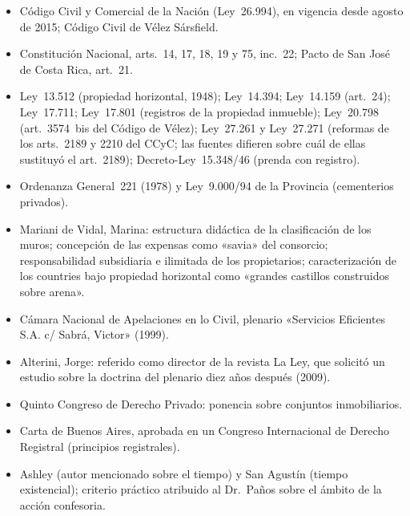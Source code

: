 \documentclass[12pt,oneside]{book}
\begin{document}
\begin{itemize}
    \item Código Civil y Comercial de la Nación (Ley~26.994), en vigencia desde agosto de 2015; Código Civil de Vélez Sársfield.
    \item Constitución Nacional, arts.~14, 17, 18, 19 y 75, inc.~22; Pacto de San José de Costa Rica, art.~21.
    \item Ley~13.512 (propiedad horizontal, 1948); Ley~14.394; Ley~14.159 (art.~24); Ley~17.711; Ley~17.801 (registros de la propiedad inmueble); Ley~20.798 (art.~3574~bis del Código de Vélez); Ley~27.261 y Ley~27.271 (reformas de los arts.~2189 y 2210 del CCyC; las fuentes difieren sobre cuál de ellas sustituyó el art.~2189); Decreto-Ley~15.348/46 (prenda con registro).
    \item Ordenanza General~221 (1978) y Ley~9.000/94 de la Provincia (cementerios privados).
    \item Mariani de Vidal, Marina: estructura didáctica de la clasificación de los muros; concepción de las expensas como «savia» del consorcio; responsabilidad subsidiaria e ilimitada de los propietarios; caracterización de los countries bajo propiedad horizontal como «grandes castillos construidos sobre arena».
    \item Cámara Nacional de Apelaciones en lo Civil, plenario «Servicios Eficientes S.A. c/ Sabrá, Victor» (1999).
    \item Alterini, Jorge: referido como director de la revista La Ley, que solicitó un estudio sobre la doctrina del plenario diez años después (2009).
    \item Quinto Congreso de Derecho Privado: ponencia sobre conjuntos inmobiliarios.
    \item Carta de Buenos Aires, aprobada en un Congreso Internacional de Derecho Registral (principios registrales).
    \item Ashley (autor mencionado sobre el tiempo) y San Agustín (tiempo existencial); criterio práctico atribuido al Dr.~Paños sobre el ámbito de la acción confesoria.
\end{itemize}
\end{document}
